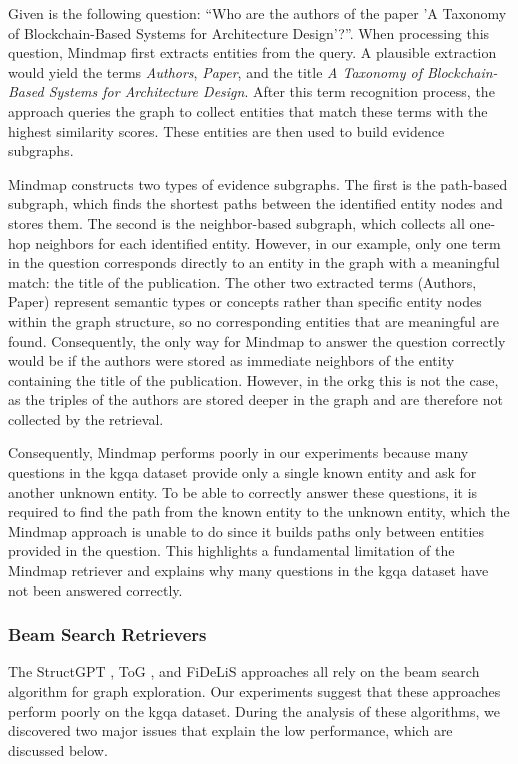 Given is the following question: \enquote{Who are the authors of the paper 'A Taxonomy of Blockchain-Based Systems for Architecture Design'?}. When processing this question, Mindmap first extracts entities from the query. A plausible extraction would yield the terms \emph{Authors}, \emph{Paper}, and the title \emph{A Taxonomy of Blockchain-Based Systems for Architecture Design}. After this term recognition process, the approach queries the graph to collect entities that match these terms with the highest similarity scores. These entities are then used to build evidence subgraphs.

Mindmap constructs two types of evidence subgraphs. The first is the path-based subgraph, which finds the shortest paths between the identified entity nodes and stores them. The second is the neighbor-based subgraph, which collects all one-hop neighbors for each identified entity. However, in our example, only one term in the question corresponds directly to an entity in the graph with a meaningful match: the title of the publication. The other two extracted terms (Authors, Paper) represent semantic types or concepts rather than specific entity nodes within the graph structure, so no corresponding entities that are meaningful are found. Consequently, the only way for Mindmap to answer the question correctly would be if the authors were stored as immediate neighbors of the entity containing the title of the publication. However, in the \gls{orkg} this is not the case, as the triples of the authors are stored deeper in the graph and are therefore not collected by the retrieval.

Consequently, Mindmap performs poorly in our experiments because many questions in the \gls{kgqa} dataset provide only a single known entity and ask for another unknown entity. To be able to correctly answer these questions, it is required to find the path from the known entity to the unknown entity, which the Mindmap approach is unable to do since it builds paths only between entities provided in the question. This highlights a fundamental limitation of the Mindmap retriever and explains why many questions in the \gls{kgqa} dataset have not been answered correctly. 


\subsubsection{Beam Search Retrievers}
The StructGPT \cite{jiang_structgpt_2023}, ToG \cite{sun_think--graph_2024}, and FiDeLiS \cite{sui_fidelis_2024} approaches all rely on the beam search algorithm for graph exploration. Our experiments suggest that these approaches perform poorly on the \gls{kgqa} dataset. During the analysis of these algorithms, we discovered two major issues that explain the low performance, which are discussed below.

